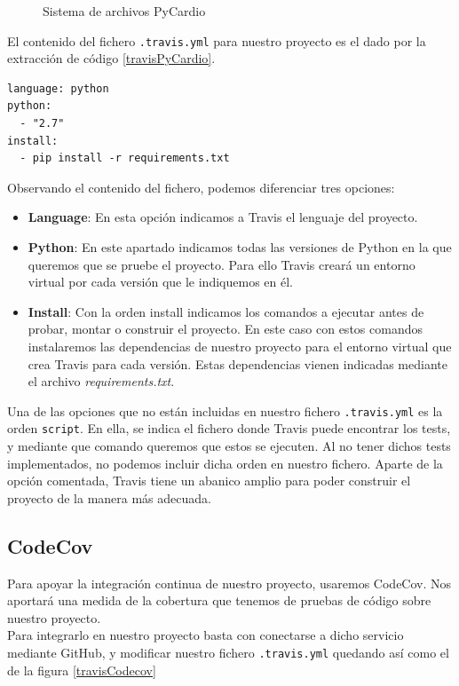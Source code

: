 \begin{figure}[h]
\centering
{}
\caption{Sistema de archivos PyCardio}
\label{fig:travisDir}
\end{figure}
El contenido del fichero \texttt{.travis.yml} para nuestro proyecto es el dado por la extracción de código \ref{travisPyCardio}. 
\begin{lstlisting}[caption={\texttt{.travis.yml} de PyCardio},label=travisPyCardio]
language: python
python:
  - "2.7"
install:
  - pip install -r requirements.txt
\end{lstlisting}
Observando el contenido del fichero, podemos diferenciar tres opciones:
\begin{itemize}
    \item \textbf{Language}: En esta opción indicamos a Travis el lenguaje del proyecto.
    \item \textbf{Python}: En este apartado indicamos todas las versiones de Python en la que queremos que se pruebe el proyecto. Para ello Travis creará un entorno virtual por cada versión que le indiquemos en él.
    \item \textbf{Install}: Con la orden install indicamos los comandos a ejecutar antes de probar, montar o construir el proyecto. En este caso con estos comandos instalaremos las dependencias de nuestro proyecto para el entorno virtual que crea Travis para cada versión. Estas dependencias vienen indicadas mediante el archivo \textit{requirements.txt}. 
\end{itemize}
Una de las opciones que no están incluidas en nuestro fichero \texttt{.travis.yml} es la orden \texttt{script}. En ella, se indica el fichero donde Travis puede encontrar los tests, y mediante que comando queremos que estos se ejecuten. Al no tener dichos tests implementados, no podemos incluir dicha orden en nuestro fichero. Aparte de la opción comentada, Travis tiene un abanico amplio para poder construir el proyecto de la manera más adecuada.

\subsection*{CodeCov}
\label{subsubsec:CodeCov}
Para apoyar la integración continua de nuestro proyecto, usaremos CodeCov. Nos aportará una medida de la cobertura que tenemos de pruebas de código sobre nuestro proyecto. \\
Para integrarlo en nuestro proyecto basta con conectarse a dicho servicio mediante GitHub, y modificar nuestro fichero \texttt{.travis.yml} quedando así como el de la figura \ref{travisCodecov}

